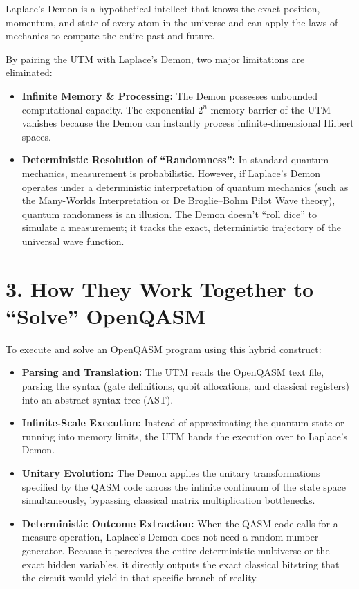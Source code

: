 Laplace's Demon is a hypothetical intellect that knows the exact position, momentum, and state of every atom in the universe and can apply the laws of mechanics to compute the entire past and future.

By pairing the UTM with Laplace's Demon, two major limitations are eliminated:

\begin{itemize}
\item \textbf{Infinite Memory \& Processing:} The Demon possesses unbounded computational capacity. The exponential \(2^n\) memory barrier of the UTM vanishes because the Demon can instantly process infinite-dimensional Hilbert spaces.
\item \textbf{Deterministic Resolution of “Randomness”:} In standard quantum mechanics, measurement is probabilistic. However, if Laplace's Demon operates under a deterministic interpretation of quantum mechanics (such as the Many-Worlds Interpretation or De Broglie–Bohm Pilot Wave theory), quantum randomness is an illusion. The Demon doesn't “roll dice” to simulate a measurement; it tracks the exact, deterministic trajectory of the universal wave function.
\end{itemize}

\section{\texorpdfstring{3. How They Work Together to “Solve” OpenQASM}{3. How They Work Together to "Solve" OpenQASM}}

To execute and solve an OpenQASM program using this hybrid construct:

\begin{itemize}
\item \textbf{Parsing and Translation:} The UTM reads the OpenQASM text file, parsing the syntax (gate definitions, qubit allocations, and classical registers) into an abstract syntax tree (AST).
\item \textbf{Infinite-Scale Execution:} Instead of approximating the quantum state or running into memory limits, the UTM hands the execution over to Laplace's Demon.
\item \textbf{Unitary Evolution:} The Demon applies the unitary transformations specified by the QASM code across the infinite continuum of the state space simultaneously, bypassing classical matrix multiplication bottlenecks.
\item \textbf{Deterministic Outcome Extraction:} When the QASM code calls for a measure operation, Laplace's Demon does not need a random number generator. Because it perceives the entire deterministic multiverse or the exact hidden variables, it directly outputs the exact classical bitstring that the circuit would yield in that specific branch of reality.
\end{itemize}
